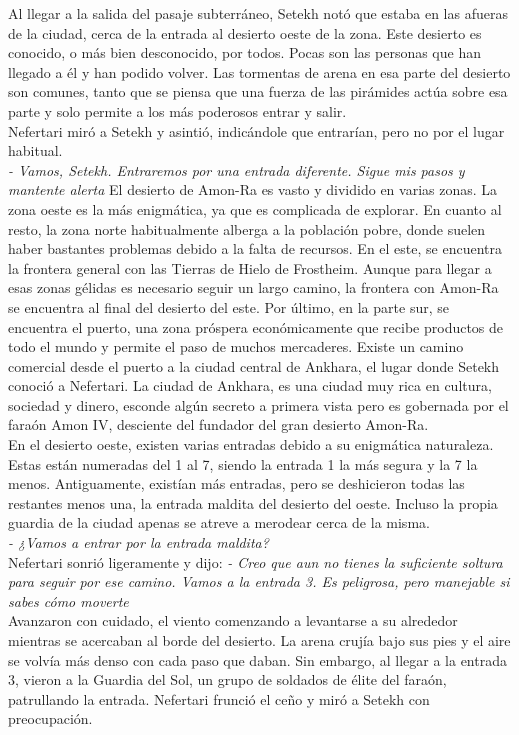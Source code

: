 Al llegar a la salida del pasaje subterráneo, Setekh notó que estaba en las afueras de la ciudad, cerca de la entrada al desierto oeste de la zona. Este desierto es conocido, o más bien desconocido, por todos. Pocas son las personas que han llegado a él y han podido volver. Las tormentas de arena en esa parte del desierto son comunes, tanto que se piensa que una fuerza de las pirámides actúa sobre esa parte y solo permite a los más poderosos entrar y salir.\\
Nefertari miró a Setekh y asintió, indicándole que entrarían, pero no por el lugar habitual.\\
\textit{- Vamos, Setekh. Entraremos por una entrada diferente. Sigue mis pasos y mantente alerta}
El desierto de Amon-Ra es vasto y dividido en varias zonas. La zona oeste es la más enigmática, ya que es complicada de explorar. En cuanto al resto, la zona norte habitualmente alberga a la población pobre, donde suelen haber bastantes problemas debido a la falta de recursos. En el este, se encuentra la frontera general con las Tierras de Hielo de Frostheim. Aunque para llegar a esas zonas gélidas es necesario seguir un largo camino, la frontera con Amon-Ra se encuentra al final del desierto del este. Por último, en la parte sur, se encuentra el puerto, una zona próspera económicamente que recibe productos de todo el mundo y permite el paso de muchos mercaderes. Existe un camino comercial desde el puerto a la ciudad central de Ankhara, el lugar donde Setekh conoció a Nefertari. La ciudad de Ankhara, es una ciudad muy rica en cultura, sociedad y dinero, esconde algún secreto a primera vista pero es gobernada por el faraón Amon IV, desciente del fundador del gran desierto Amon-Ra.\\
En el desierto oeste, existen varias entradas debido a su enigmática naturaleza. Estas están numeradas del 1 al 7, siendo la entrada 1 la más segura y la 7 la menos. Antiguamente, existían más entradas, pero se deshicieron todas las restantes menos una, la entrada maldita del desierto del oeste. Incluso la propia guardia de la ciudad apenas se atreve a merodear cerca de la misma.\\
\textit{- ¿Vamos a entrar por la entrada maldita?}\\
Nefertari sonrió ligeramente y dijo:
\textit{- Creo que aun no tienes la suficiente soltura para seguir por ese camino. Vamos a la entrada 3. Es peligrosa, pero manejable si sabes cómo moverte}\\
Avanzaron con cuidado, el viento comenzando a levantarse a su alrededor mientras se acercaban al borde del desierto. La arena crujía bajo sus pies y el aire se volvía más denso con cada paso que daban. Sin embargo, al llegar a la entrada 3, vieron a la Guardia del Sol, un grupo de soldados de élite del faraón, patrullando la entrada. Nefertari frunció el ceño y miró a Setekh con preocupación.\\
